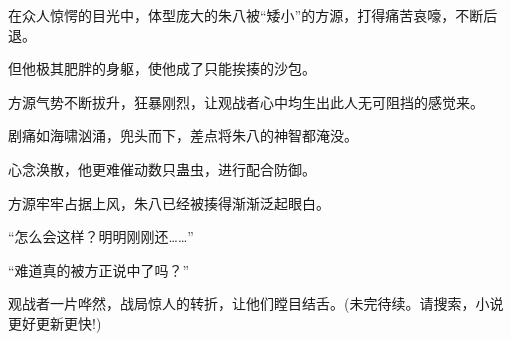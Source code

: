 \begin{this_body}
在众人惊愕的目光中，体型庞大的朱八被“矮小”的方源，打得痛苦哀嚎，不断后退。

但他极其肥胖的身躯，使他成了只能挨揍的沙包。

方源气势不断拔升，狂暴刚烈，让观战者心中均生出此人无可阻挡的感觉来。

剧痛如海啸汹涌，兜头而下，差点将朱八的神智都淹没。

心念涣散，他更难催动数只蛊虫，进行配合防御。

方源牢牢占据上风，朱八已经被揍得渐渐泛起眼白。

“怎么会这样？明明刚刚还……”

“难道真的被方正说中了吗？”

观战者一片哗然，战局惊人的转折，让他们瞠目结舌。(未完待续。请搜索，小说更好更新更快!)

\end{this_body}

